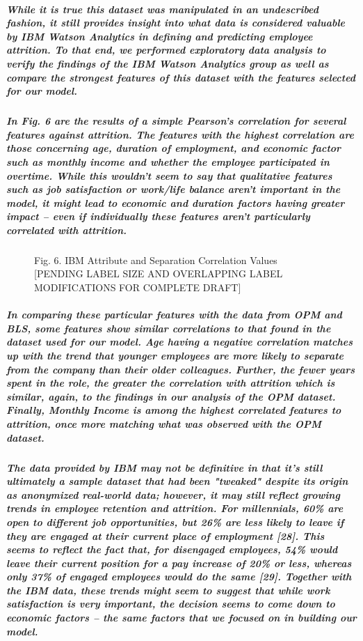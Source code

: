\documentclass{article}
\begin{document}
\subparagraph{While it is true this dataset was manipulated in an undescribed fashion, it still provides insight into what data is considered valuable by IBM Watson Analytics in defining and predicting employee attrition. To that end, we performed exploratory data analysis to verify the findings of the IBM Watson Analytics group as well as compare the strongest features of this dataset with the features selected for our model.}

\subparagraph{In Fig. 6 are the results of a simple Pearson's correlation for several features against attrition. The features with the highest correlation are those concerning age, duration of employment, and economic factor such as monthly income and whether the employee participated in overtime. While this wouldn't seem to say that qualitative features such as job satisfaction or work/life balance aren't important in the model, it might lead to economic and duration factors having greater impact – even if individually these features aren't particularly correlated with attrition.}

\begin{figure}
\caption{Fig. 6. IBM Attribute and Separation Correlation Values [PENDING LABEL SIZE AND OVERLAPPING LABEL MODIFICATIONS FOR COMPLETE DRAFT]}
\end{figure}
 
\subparagraph{In comparing these particular features with the data from OPM and BLS, some features show similar correlations to that found in the dataset used for our model. Age having a negative correlation matches up with the trend that younger employees are more likely to separate from the company than their older colleagues. Further, the fewer years spent in the role, the greater the correlation with attrition which is similar, again, to the findings in our analysis of the OPM dataset. Finally, Monthly Income is among the highest correlated features to attrition, once more matching what was observed with the OPM dataset.}
 
\subparagraph{The data provided by IBM may not be definitive in that it's still ultimately a sample dataset that had been "tweaked" despite its origin as anonymized real-world data; however, it may still reflect growing trends in employee retention and attrition. For millennials, 60\% are open to different job opportunities, but 26\% are less likely to leave if they are engaged at their current place of employment [28]. This seems to reflect the fact that, for disengaged employees, 54\% would leave their current position for a pay increase of 20\% or less, whereas only 37\% of engaged employees would do the same [29]. Together with the IBM data, these trends might seem to suggest that while work satisfaction is very important, the decision seems to come down to economic factors – the same factors that we focused on in building our model.}
 
\end{document}

